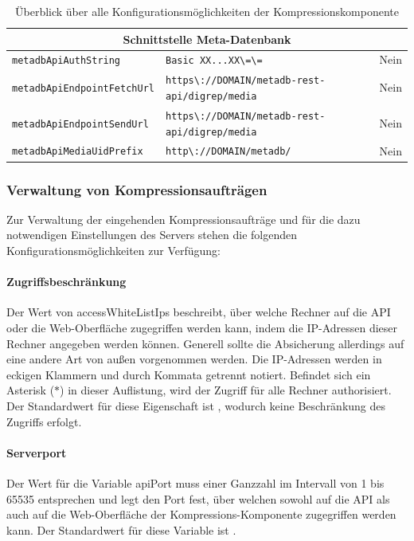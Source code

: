 \begin{table}
\begin{center}
\begin{tabular}{lll}
\hline
\multicolumn{3}{c}{Schnittstelle Meta-Datenbank} \\
\hline
{\lstinline|metadbApiAuthString|} & {\lstinline|Basic XX...XX\=\=|} & {\footnotesize Nein} \\
{\lstinline|metadbApiEndpointFetchUrl|} & {\lstinline|https\://DOMAIN/metadb-rest-api/digrep/media|} & {\footnotesize Nein} \\
{\lstinline|metadbApiEndpointSendUrl|} & {\lstinline|https\://DOMAIN/metadb-rest-api/digrep/media|} & {\footnotesize Nein} \\
{\lstinline|metadbApiMediaUidPrefix|} & {\lstinline|http\://DOMAIN/metadb/|} & {\footnotesize Nein} \\
\end{tabular}%
\caption{Überblick über alle Konfigurationsmöglichkeiten der Kompressionskomponente}
\label{schlenke:tbl:configOptions}
\end{center}
\end{table}

\subsubsection{Verwaltung von Kompressionsaufträgen}

Zur Verwaltung der eingehenden Kompressionsaufträge und für die dazu notwendigen Einstellungen des Servers stehen die folgenden Konfigurationsmöglichkeiten zur Verfügung:

\paragraph{Zugriffsbeschränkung} Der Wert von {\ttfamily access\-White\-List\-Ips} beschreibt, über welche Rechner auf die API oder die Web-Oberfläche zugegriffen werden kann, indem die IP-Adressen dieser Rechner angegeben werden können. Generell sollte die Absicherung allerdings auf eine andere Art von außen vorgenommen werden. Die IP-Adressen werden in eckigen Klammern und durch Kommata getrennt notiert. Befindet sich ein Asterisk (\glqq{}$\ast$\grqq{}) in dieser Auflistung, wird der Zugriff für alle Rechner authorisiert. Der Standardwert für diese Eigenschaft ist  {\ttfamily [127.0.0.1, *]}, wodurch keine Beschränkung des Zugriffs erfolgt.

\paragraph{Serverport} Der Wert für die Variable {\ttfamily api\-Port} muss einer Ganzzahl im Intervall von 1 bis 65535 entsprechen und legt den Port fest, über welchen sowohl auf die API als auch auf die Web-Oberfläche der Kompressions-Komponente zugegriffen werden kann. Der Standardwert für diese Variable ist {}.

